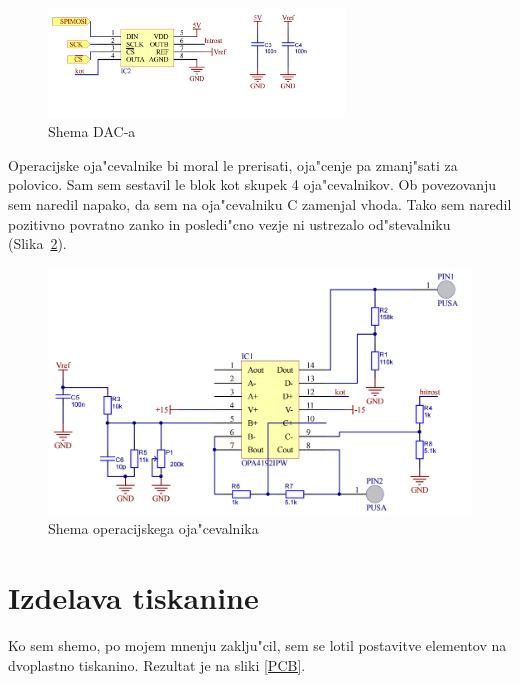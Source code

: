 \documentclass[a4paper]{article}
\begin{document}
	\begin{figure}[!h]
		\centering
		\includegraphics[width=0.7\textwidth]{DAC.png}
		\caption{Shema DAC-a}
		\label{DACshema}
	\end{figure}



Operacijske oja"cevalnike bi moral le prerisati, oja"cenje pa zmanj"sati za polovico. Sam sem sestavil le blok kot skupek 4 oja"cevalnikov. Ob povezovanju sem naredil napako, da sem na  oja"cevalniku C zamenjal vhoda. Tako sem naredil pozitivno povratno zanko in posledi"cno vezje ni ustrezalo od"stevalniku (Slika~\ref{OPshema}).


	\begin{figure}[!h]
		\centering
		\includegraphics[width=\textwidth]{OP.png}
		\caption{Shema operacijskega oja"cevalnika}
		\label{OPshema}
	\end{figure}


\section{Izdelava tiskanine}

Ko sem shemo, po mojem mnenju zaklju"cil, sem se lotil postavitve elementov na dvoplastno tiskanino. Rezultat je na sliki \ref{PCB}.
\end{document}
